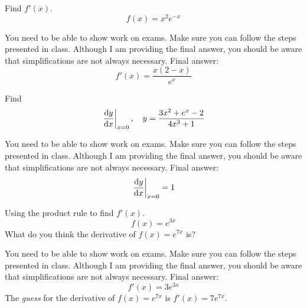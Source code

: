 \documentclass[12pt,addpoints, answers, fleqn]{exam}
\begin{document}
\begin{questions}
\question Find $f'\left(x\right)$.
\[
f\left(x\right) = x^2 e^{-x}
\]

\begin{solution}
You need to be able to show work on exams. Make sure you can follow the steps presented in class. Although I am providing the final answer, you should be aware that simplifications are not always necessary.
Final answer:
\[
f'\left(x\right) =  \frac{x\left( 2-x\right)}{e^x}
\]
\end{solution}

\question Find
\[
\left. \frac{{\rm{d}}y}{{\rm{d}}x} \right|_{x=0}, \quad y = \frac{3x^2+e^x-2}{4x^3+1}
\]

\begin{solution}
You need to be able to show work on exams. Make sure you can follow the steps presented in class. Although I am providing the final answer, you should be aware that simplifications are not always necessary.
Final answer:
\[
\left. \frac{{\rm{d}}y}{{\rm{d}}x} \right|_{x=0} = 1
\]
\end{solution}

\question Using the product rule to find $f'\left(x\right)$.
\[
f\left(x\right) = e^{3x}
\]
What do you think the derivative of $f\left(x\right) = e^{7x}$ is?

\begin{solution}
You need to be able to show work on exams. Make sure you can follow the steps presented in class. Although I am providing the final answer, you should be aware that simplifications are not always necessary.
Final answer:
\[
f'\left(x\right) =  3 e^{3x}
\]
The \emph{guess} for the derivative of $f\left(x\right) = e^{7x}$ is $f'\left(x\right) = 7e^{7x}$. 
\end{solution}


\end{questions}
\end{document}
